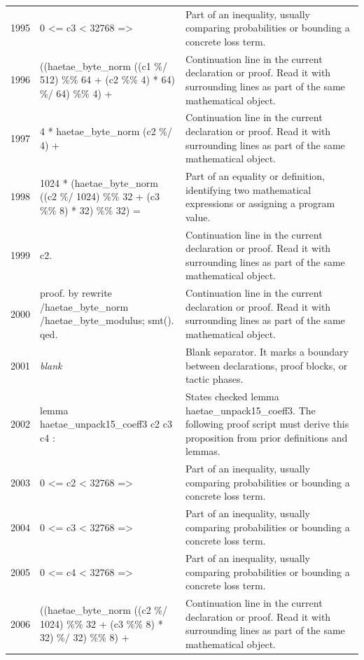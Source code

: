 \documentclass[10pt]{article}
\begin{document}
\begin{longtable}{r L{0.53\textwidth} L{0.37\textwidth}}
1995 & {\ttfamily\scriptsize   0 <= c3 < 32768 =>} & Part of an inequality, usually comparing probabilities or bounding a concrete loss term. \\
1996 & {\ttfamily\scriptsize   ((haetae\_byte\_norm ((c1 \%/ 512) \%\% 64 + (c2 \%\% 4) * 64) \%/ 64) \%\% 4) +} & Continuation line in the current declaration or proof.  Read it with surrounding lines as part of the same mathematical object. \\
1997 & {\ttfamily\scriptsize     4 * haetae\_byte\_norm (c2 \%/ 4) +} & Continuation line in the current declaration or proof.  Read it with surrounding lines as part of the same mathematical object. \\
1998 & {\ttfamily\scriptsize     1024 * (haetae\_byte\_norm ((c2 \%/ 1024) \%\% 32 + (c3 \%\% 8) * 32) \%\% 32) =} & Part of an equality or definition, identifying two mathematical expressions or assigning a program value. \\
1999 & {\ttfamily\scriptsize   c2.} & Continuation line in the current declaration or proof.  Read it with surrounding lines as part of the same mathematical object. \\
2000 & {\ttfamily\scriptsize proof. by rewrite /haetae\_byte\_norm /haetae\_byte\_modulus; smt(). qed.} & Continuation line in the current declaration or proof.  Read it with surrounding lines as part of the same mathematical object. \\
2001 & {\ttfamily\scriptsize \emph{blank}} & Blank separator.  It marks a boundary between declarations, proof blocks, or tactic phases. \\
2002 & {\ttfamily\scriptsize lemma haetae\_unpack15\_coeff3 c2 c3 c4 :} & States checked lemma haetae\_unpack15\_coeff3.  The following proof script must derive this proposition from prior definitions and lemmas. \\
2003 & {\ttfamily\scriptsize   0 <= c2 < 32768 =>} & Part of an inequality, usually comparing probabilities or bounding a concrete loss term. \\
2004 & {\ttfamily\scriptsize   0 <= c3 < 32768 =>} & Part of an inequality, usually comparing probabilities or bounding a concrete loss term. \\
2005 & {\ttfamily\scriptsize   0 <= c4 < 32768 =>} & Part of an inequality, usually comparing probabilities or bounding a concrete loss term. \\
2006 & {\ttfamily\scriptsize   ((haetae\_byte\_norm ((c2 \%/ 1024) \%\% 32 + (c3 \%\% 8) * 32) \%/ 32) \%\% 8) +} & Continuation line in the current declaration or proof.  Read it with surrounding lines as part of the same mathematical object. \\

\end{longtable}
\end{document}
